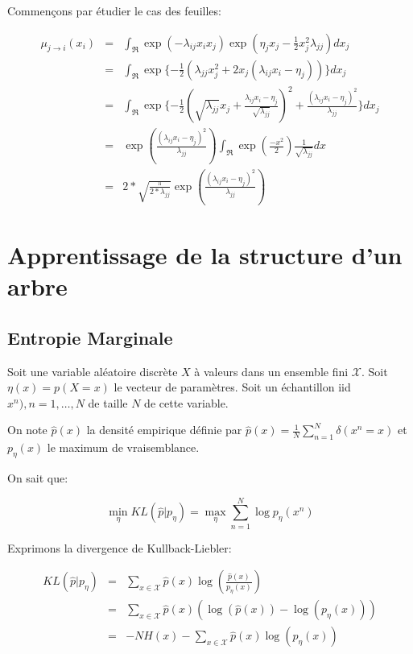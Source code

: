 \documentclass{article}
\begin{document}
Commençons par étudier le cas des feuilles:

\begin{align}
\mu_{j \rightarrow i}(x_i) & = & \int_{\Re} \exp(- \lambda_{ij} x_i x_j) \exp( \eta_j x_j - \frac{1}{2} x_j ^2\lambda_{jj}) dx_j \\
			   & = & \int_{\Re} \exp \{ - \frac{1}{2} (\lambda_{jj}x_j^2 + 2x_j(\lambda_{ij}x_i - \eta_j) )\} dx_j \\
			   & = & \int_{\Re} \exp \{ - \frac{1}{2} (\sqrt{\lambda_{jj}}x_j + \frac{\lambda_{ij}x_i - \eta_j}{\sqrt{\lambda_{jj}}})^2 + \frac{(\lambda_{ij}x_i - \eta_j)^2}{\lambda_{jj}}\} dx_j \\
			   & = & \exp(\frac{(\lambda_{ij}x_i - \eta_j)^2}{\lambda_{jj}}) \int_{\Re} \exp(\frac{-x^2}{2}) \frac{1}{\sqrt{\lambda_{jj}}}dx \\
			   & = & 2 * \sqrt{\frac{\pi}{2 * \lambda_{jj}}}\exp(\frac{(\lambda_{ij}x_i - \eta_j)^2}{\lambda_{jj}}) 
\end{align}

\section{Apprentissage de la structure d'un arbre}

\subsection{Entropie Marginale}

Soit une variable aléatoire discrète $X$ à valeurs dans un ensemble fini
$\mathcal{X}$. Soit $\eta(x) = p(X =x)$ le vecteur de paramètres. Soit un
échantillon iid $x^n), n=1, \dots, N$ de taille $N$ de cette variable.

On note $\hat{p}(x)$ la densité empirique définie par $\hat{p}(x) =
\frac{1}{N} \sum_{n=1}^N \delta(x^n = x)$ et $p_{\eta}(x)$ le maximum de vraisemblance.

On sait que:

\begin{equation}
\label{minKL-maxlog}
\min_{\eta} KL(\hat{p}|p_{\eta}) = \max_{\eta} \sum_{n = 1}^N \log p_{\eta}(x^n)
\end{equation}

Exprimons la divergence de Kullback-Liebler:

\begin{align}
KL(\hat{p}|p_{\eta}) & = & \sum_{x \in \mathcal{X}} \hat{p}(x) \log(\frac{\hat{p}(x)}{p_{\eta}(x)}) \\
		     & = & \sum_{x \in \mathcal{X}} \hat{p}(x) (\log(\hat{p}(x)) - \log(p_{\eta}(x))) \\
		     & = & - NH(x) - \sum_{x \in \mathcal{X}} \hat{p}(x) \log(p_{\eta}(x))
\end{align}
\end{document}
